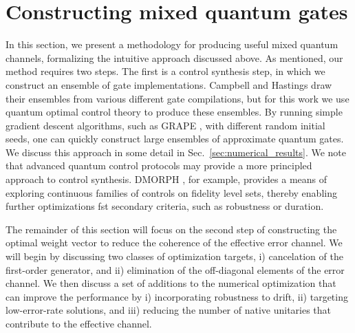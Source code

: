 \documentclass[aps,nofootinbib,pra,notitlepage,twocolumn]{revtex4-1}
\begin{document}
\section{Constructing mixed quantum gates}
\label{sec:mixed_unitary_processes}
\noindent In this section, we present a methodology for producing useful mixed quantum channels, formalizing the intuitive approach discussed above. As mentioned, our method requires two steps. The first is a control synthesis step, in which we construct an ensemble of gate implementations. Campbell and Hastings draw their ensembles from various different gate compilations, but for this work we use quantum optimal control theory to produce these ensembles. By running simple gradient descent algorithms, such as GRAPE \cite{Khaneja2005}, with different random initial seeds, one can quickly construct large ensembles of approximate quantum gates. We discuss this approach in some detail in Sec.~\ref{sec:numerical_results}. We note that advanced quantum control protocols may provide a more principled approach to control synthesis. DMORPH \cite{dominy2008exploring}, for example, provides a means of exploring continuous families of controls on fidelity level sets, thereby enabling further optimizations  fst secondary criteria, such as robustness or duration.  

The remainder of this section will focus on the second step of constructing the optimal weight vector to reduce the coherence of the effective error channel. We will begin by discussing two classes of optimization targets, i) cancelation of the first-order generator, and ii) elimination of the off-diagonal elements of the error channel. We then discuss a set of additions to the numerical optimization that can improve the performance by i) incorporating robustness to drift,  ii) targeting low-error-rate solutions, and iii) reducing the number of native unitaries that contribute to the effective channel. 

\end{document}
